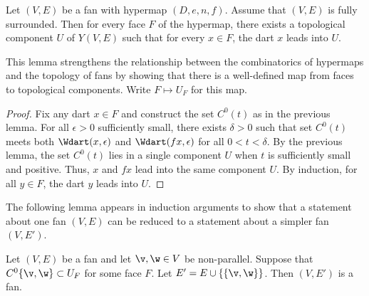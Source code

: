 \begin{lemma} \label{lemma:UF}
Let $(V,E)$ be a fan with hypermap $(D,e,n,f)$.  Assume that $(V,E)$
is fully surrounded.  Then for every face $F$ of the hypermap, there
exists a topological component $U$ of $Y(V,E)$ such that for every
$x\in F$, the dart $x$ leads into $U$.
\end{lemma}
%
%
%

This lemma strengthens the relationship between the
combinatorics of hypermaps and the topology of fans by showing that there is a
well-defined map from faces to topological components.  Write
$F\mapsto U_F$ for this map.
%

\begin{proof} Fix any dart $x\in F$ and construct the set $C^0(t)$ as
in the previous lemma.  For all $\epsilon>0$ sufficiently small,
there exists $\delta>0$ such that set $C^0(t)$ meets both
$\Wdart(x,\epsilon)$ and $\Wdart(f x,\epsilon)$ for all
$0<t<\delta$.  By the previous lemma, the set $C^0(t)$ lies in a
single component $U$ when $t$ is sufficiently small and positive.
Thus, $x$ and $f x$ lead into the same component $U$.  By induction,
for all $y\in F$, the dart $y$ leads into $U$.
\end{proof}

The following lemma appears in induction arguments to show
that a statement about one fan $(V,E)$ can be reduced to a statement
about a simpler fan $(V,E')$.

\begin{lemma}\label{lemma:add-edge}
Let $(V,E)$ be a fan and let $\v,\w\in V$ be non-parallel.  Suppose
that $C^0\{\v,\w\}\subset U_F$ for some face $F$.  Let $E' =
E\cup\{\{\v,\w\}\}$.  Then $(V,E')$ is a fan.
\end{lemma}

